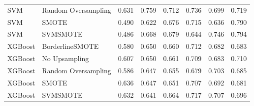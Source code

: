 \begin{tabular}{llllllll}
                         SVM & Random Oversampling & 0.631 &                     0.759 &                 0.712 &                  0.736 &                                   0.699 &    0.719 \\
                         SVM &               SMOTE & 0.490 &                     0.622 &                 0.676 &                  0.715 &                                   0.636 &    0.790 \\
                         SVM &            SVMSMOTE & 0.486 &                     0.668 &                 0.679 &                  0.644 &                                   0.746 &    0.794 \\
                     XGBoost &     BorderlineSMOTE & 0.580 &                     0.650 &                 0.660 &                  0.712 &                                   0.682 &    0.683 \\
                     XGBoost &       No Upsampling & 0.607 &                     0.650 &                 0.661 &                  0.709 &                                   0.683 &    0.710 \\
                     XGBoost & Random Oversampling & 0.586 &                     0.647 &                 0.655 &                  0.679 &                                   0.703 &    0.685 \\
                     XGBoost &               SMOTE & 0.636 &                     0.647 &                 0.651 &                  0.707 &                                   0.692 &    0.681 \\
                     XGBoost &            SVMSMOTE & 0.632 &                     0.641 &                 0.664 &                  0.717 &                                   0.707 &    0.696 \\
\bottomrule
\end{tabular}

